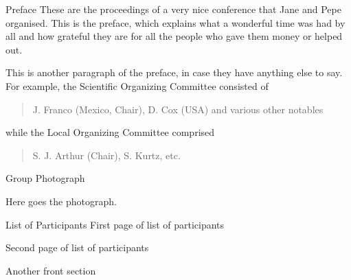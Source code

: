 \documentclass[book,journal,twocolumn]{rmaa}
\begin{document}
\frontmatter %

\renewcommand{\RMAAbannerimage}{rmsc_blank}
\tableofcontents

\begin{frontsection}{Preface}{%
    }
  These are the proceedings of a very nice conference that Jane and
  Pepe organised. This is the preface, which explains what a wonderful
  time was had by all and how grateful they are for all the people who
  gave them money or helped out.
  
  This is another paragraph of the preface, in case they have anything
  else to say.  For example, the Scientific Organizing Committee
  consisted of
  \begin{quote}
    J. Franco (Mexico, Chair), D. Cox (USA) and various other notables
  \end{quote}
  while the Local Organizing Committee comprised
  \begin{quote}
    S. J. Arthur (Chair), S. Kurtz, etc.
  \end{quote}

  \EditorSignature

\end{frontsection}

\begin{frontsection}[Photo]{Group Photograph}{\notitle}
\null\vfill
\centerline{Here goes the photograph.}
\vfill
\end{frontsection}

\begin{frontsection}[Participants]{List of Participants}{}
\vfil
\dotfill First page of list of participants \dotfill
\vfil\clearpage

\null\vfil
\dotfill Second page of list of participants \dotfill
\vfil

\end{frontsection}

\begin{frontsection}[XXX]{Another front section}{}

\end{frontsection}
\end{document}
